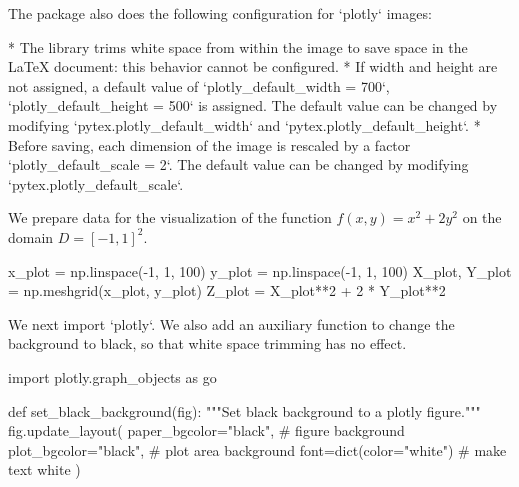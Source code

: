 \documentclass[oneside]{book}
\begin{document}
\begin{mdcell}
The package also does the following configuration for `plotly` images:

* The library trims white space from within the image to save space in the LaTeX document: this behavior cannot be configured.
* If width and height are not assigned, a default value of `plotly_default_width = 700`, `plotly_default_height = 500` is assigned. The default value can be changed by modifying `pytex.plotly_default_width` and `pytex.plotly_default_height`.
* Before saving, each dimension of the image is rescaled by a factor `plotly_default_scale = 2`. The default value can be changed by modifying `pytex.plotly_default_scale`.
\end{mdcell}

\begin{mdcell}
We prepare data for the visualization of the function $f(x, y) = x^2 + 2 y^2$ on the domain $D = [-1, 1]^2$.
\end{mdcell}

\begin{pycell}
x_plot = np.linspace(-1, 1, 100)
y_plot = np.linspace(-1, 1, 100)
X_plot, Y_plot = np.meshgrid(x_plot, y_plot)
Z_plot = X_plot**2 + 2 * Y_plot**2
\end{pycell}

\begin{mdcell}
We next import `plotly`. We also add an auxiliary function to change the background to black, so that white space trimming has no effect.
\end{mdcell}

\begin{pycell}
import plotly.graph_objects as go
\end{pycell}

\begin{pycell}
def set_black_background(fig):
    """Set black background to a plotly figure."""
    fig.update_layout(
        paper_bgcolor="black",   # figure background
        plot_bgcolor="black",    # plot area background
        font=dict(color="white") # make text white
    )
\end{pycell}
\end{document}
